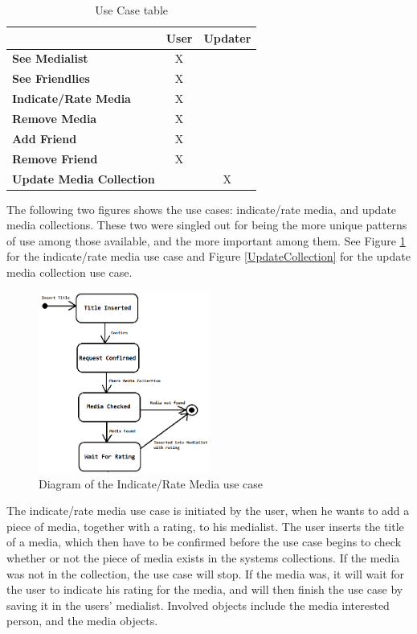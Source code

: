 \begin{table}[htb]
\centering
\begin{tabular}{|l|c|c|} \hline
	  & \textbf{User} & \textbf{Updater} \\ \hline
	\textbf{See Medialist} & X &  \\ \hline
	\textbf{See Friendlies} & X &  \\ \hline
	\textbf{Indicate/Rate Media} & X &  \\ \hline
	\textbf{Remove Media} & X &  \\ \hline
	\textbf{Add Friend} & X &  \\ \hline
	\textbf{Remove Friend} & X &  \\ \hline
	\textbf{Update Media Collection} &  & X \\ \hline
\end{tabular}
\caption{Use Case table}
\label{UseTable}
\end{table}

The following two figures shows the use cases: indicate/rate media, and update media collections. These two were singled out for being the more unique patterns of use among those available, and the more important among them. See Figure \ref{IndicateMedia} for the indicate/rate media use case and Figure \ref{UpdateCollection} for the update media collection use case.

\begin{figure}[htb]
\centering
\includegraphics[width=0.5\textwidth]{Images/IndicateMedia.png}
\caption{Diagram of the Indicate/Rate Media use case}
\label{IndicateMedia}
\end{figure}

The indicate/rate media use case is initiated by the user, when he wants to add a piece of media, together with a rating, to his medialist. The user inserts the title of a media, which then have to be confirmed before the use case begins to check whether or not the piece of media exists in the systems collections. If the media was not in the collection, the use case will stop. If the media was, it will wait for the user to indicate his rating for the media, and will then finish the use case by saving it in the users' medialist. Involved objects include the media interested person, and the media objects.

